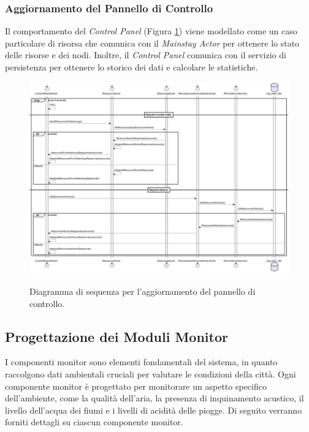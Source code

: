 \documentclass[12pt]{article}
\begin{document}
\subsubsection{Aggiornamento del Pannello di Controllo}

Il comportamento del \textit{Control Panel} (Figura \ref{fig:control-panel-sequence-diagram}) viene modellato come un caso particolare di risorsa che comunica con il \textit{Mainstay Actor} per ottenere lo stato delle risorse e dei nodi. Inoltre, il \textit{Control Panel} comunica con il servizio di persistenza per ottenere lo storico dei dati e calcolare le statistiche.

\begin{figure}[H]
    \caption{Diagramma di sequenza per l'aggiornamento del pannello di controllo.}
    \includegraphics[width=\textwidth]{../assets/images/control-panel-sequence-diagram.png}
    \label{fig:control-panel-sequence-diagram}
\end{figure}

\subsection{Progettazione dei Moduli Monitor}
I componenti monitor sono elementi fondamentali del sistema, in quanto raccolgono dati ambientali cruciali per valutare le condizioni della città. Ogni componente monitor è progettato per monitorare un aspetto specifico dell'ambiente, come la qualità dell'aria, la presenza di inquinamento acustico, il livello dell'acqua dei fiumi e i livelli di acidità delle piogge. Di seguito verranno forniti dettagli su ciascun componente monitor.
\end{document}
